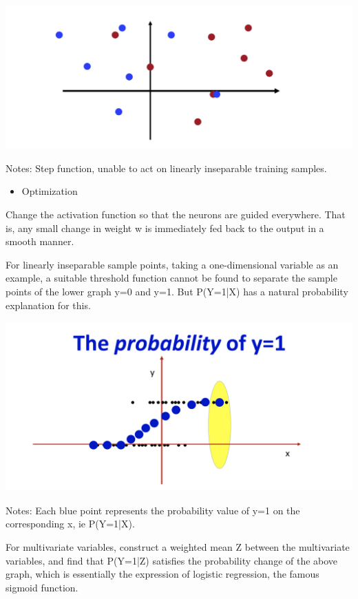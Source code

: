 \documentclass{article}
\begin{document}
	\includegraphics[scale=0.2]{54.png}
	
	Notes: Step function, unable to act on linearly inseparable training samples.
	
	\begin{itemize}
		\item Optimization
	\end{itemize}
	
	Change the activation function so that the neurons are guided everywhere. That is, any small change in weight w is immediately fed back to the output in a smooth manner.
	
	For linearly inseparable sample points, taking a one-dimensional variable as an example, a suitable threshold function cannot be found to separate the sample points of the lower graph y=0 and y=1. But P(Y=1|X) has a natural probability explanation for this.
	
	\includegraphics[scale=0.2]{55.png}
	
	Notes: Each blue point represents the probability value of y=1 on the corresponding x, ie P(Y=1|X).
	
	For multivariate variables, construct a weighted mean Z between the multivariate variables, and find that P(Y=1|Z) satisfies the probability change of the above graph, which is essentially the expression of logistic regression, the famous sigmoid function.
	
\end{document}
